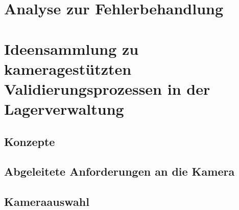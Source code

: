 \documentclass[11pt]{article}
\begin{document}
    \newpage
    \section{Analyse zur Fehlerbehandlung}

    \newpage
    \section {Ideensammlung zu kameragestützten Validierungsprozessen in der Lagerverwaltung}

    \subsection {Konzepte}

    \subsection {Abgeleitete Anforderungen an die Kamera}

    \subsection {Kameraauswahl}
\end{document}
